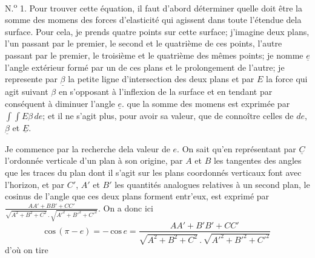 \documentclass[11pt,a4paper]{article}
\begin{document}
N.\textsuperscript{o} 1. Pour trouver cette équation, il faut d'abord déterminer quelle
doit être la somme des momens des forces d'elasticité qui agissent
dans toute l'étendue dela surface. Pour cela, je prends
quatre points sur cette surface; j'imagine deux plans, l'un
passant par le premier, le second et le quatrième de ces
points, l'autre passant par le premier, le troisième et le
quatrième des mêmes points; je nomme $\underline{e}$ l'angle extérieur
formé par un de ces plans et le prolongement de l'autre;
je represente par $\underline{\beta}$ la petite ligne d'intersection des deux plans
et par $E$ la force qui agit suivant $\beta$ en s'opposant à
l'inflexion de la surface et en tendant par conséquent à
diminuer l'angle $\underline{e}$.   que la somme des momens
est exprimée par $\int\!\!\int E\beta\,de$; et  il ne s'agit plus, pour
avoir sa valeur, que de connoître celles de $de$, $\underline{\beta}$ et $\underline{E}$.

Je commence par la recherche dela valeur de $e$.
On sait qu'en représentant par $\underline{C}$ l'ordonnée verticale
d'un plan à son origine, par $A$ et $B$ les tangentes des
angles que les traces du plan dont il s'agit sur les plans
coordonnés verticaux font avec l'horizon, et par $C'$, $A'$ et $B'$
les quantités analogues relatives à un second plan, le cosinus
de l'angle que ces deux plans forment entr'eux, est
exprimé par $\frac{AA' + BB' + CC'}{\sqrt{A^2 + B^2 + C^2}\,.\,\sqrt{A'^2 + B'^2 + C'^2}}$. On a donc ici
\[ \text{cos}\,(\pi - e) = -\,\text{cos}\,e = \frac{AA' + B'B' + CC'}{\sqrt{A^2 + B^2 + C^2}\,.\,\sqrt{A'^2 + B'^2 + C'^2}} \]
d'où on tire

\end{document}
